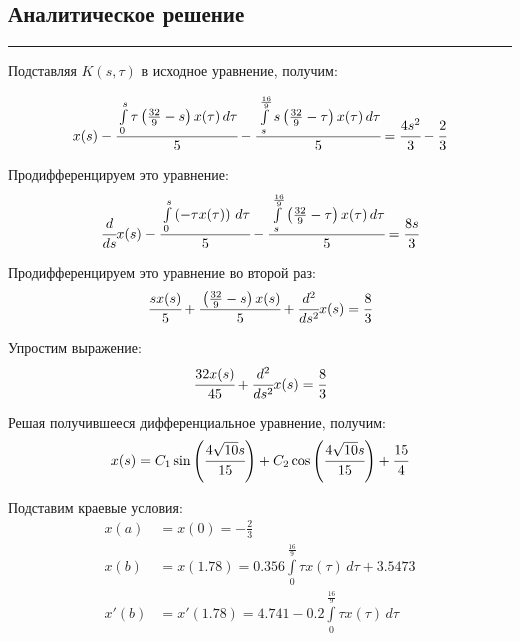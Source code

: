 \documentclass[a4paper, 14pt]{extarticle}
\begin{document}
\newpage

\subsection*{Аналитическое решение}\vspace{-20pt}\rule{\linewidth}{0.1mm}

Подставляя $K(s, \tau)$ в исходное уравнение, получим:

\begin{equation*}
    x(s) - \cfrac{\int\limits_{0}^{s} \tau \left(\frac{32}{9} - s\right) x(\tau) \, d\tau}{5} - \cfrac{\int\limits_{s}^{\frac{16}{9}} s \left(\frac{32}{9} - \tau\right) x(\tau) \, d\tau}{5} = \cfrac{4 s^{2}}{3} - \cfrac{2}{3}
\end{equation*}

Продифференцируем это уравнение:
\begin{equation*}
    \cfrac{d}{d s} x(s) - \cfrac{\int\limits_{0}^{s} \left(- \tau x(\tau)\right) \, d\tau}{5} - \cfrac{\int\limits_{s}^{\frac{16}{9}} \left(\frac{32}{9} - \tau\right) x(\tau) \, d\tau}{5} = \cfrac{8 s}{3}
\end{equation*} 

Продифференцируем это уравнение во второй раз:
\begin{equation*}
    \cfrac{s x(s)}{5} + \cfrac{\left(\frac{32}{9} - s\right) x(s)}{5} + \cfrac{d^{2}}{d s^{2}} x(s) = \cfrac{8}{3}
\end{equation*}

Упростим выражение:
\begin{equation*}
    \cfrac{32 x(s)}{45} + \cfrac{d^{2}}{d s^{2}} x(s) = \cfrac{8}{3}
\end{equation*}
    
Решая получившееся дифференциальное уравнение, получим:
\begin{equation*}
    x(s) = C_{1} \sin\left(\cfrac{4 \sqrt{10} s}{15}\right) + C_{2} \cos\left(\cfrac{4 \sqrt{10} s}{15}\right) + \cfrac{15}{4}
\end{equation*}

Подставим краевые условия:
\begin{align*}
    x(a) &= x(0) = -\frac{2}{3} \\
    x(b) &= x(1.78) = 0.356 \int\limits_{0}^{\frac{16}{9}} \tau x(\tau) \, d\tau + 3.5473 \\
    x'(b) &= x'(1.78) = 4.741 - 0.2 \int\limits_{0}^{\frac{16}{9}} \tau x(\tau) \, d\tau
\end{align*}
\end{document}
